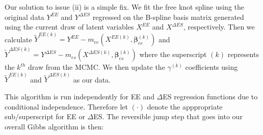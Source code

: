 \documentclass[11pt]{article}\usepackage[]{graphicx}\usepackage[]{color}
\begin{document}
Our solution to issue (ii) is a simple fix. We fit the free knot spline using the original data $Y^{EE}$ and $Y^{\Delta ES}$ regressed on the B-spline basis matrix generated using the current draw of latent variables $X^{EE}$ and $X^{\Delta ES}$, respectively. Then we calculate $\tilde{Y}^{EE(k)}=Y^{EE}-m_{ee}(X^{EE(k)},\boldsymbol{\beta}_{ee}^{(k)})$ and $\tilde{Y}^{\Delta ES(k)}=Y^{\Delta ES}-m_{es}(X^{\Delta ES(k)},\boldsymbol{\beta}_{es}^{(k)})$ where the superscript $(k)$ represents the $k^{th}$ draw from the MCMC. We then update the $\gamma^{(k)}$ coefficients using $\tilde{Y}^{EE(k)}$ and $\tilde{Y}^{\Delta ES(k)}$ as our data.

This algorithm is run independently for EE and $\Delta$ES regression functions due to conditional independence. Therefore let $(\cdot)$ denote the apppropriate sub/superscript for EE or $\Delta$ES. The reversible jump step that goes into our overall Gibbs algorithm is then:
\end{document}
